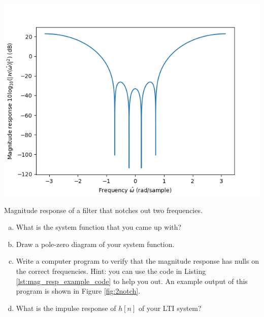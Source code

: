 \begin{enumerate}
        \begin{marginfigure}
          \begin{center}
            \includegraphics[width=\textwidth]{ch18/figures/ex_magresp.png}
          \end{center}
          \caption{Magnitude response of a filter that notches out two frequencies.}
          \label{fig:2notch}
        \end{marginfigure}

        \begin{enumerate}[a)]
          \item What is the system function that you came up with?
          \item Draw a pole-zero diagram of your system function.
          \item Write a computer program to verify that the magnitude response has nulls on the correct frequencies. 
          Hint: you can use the code in Listing \ref{lst:mag_resp_example_code} to help you out. 
          An example output of this program is shown in Figure \ref{fig:2notch}.
          \item What is the impulse response of $h[n]$ of your LTI system?
        \end{enumerate}
\end{enumerate}


